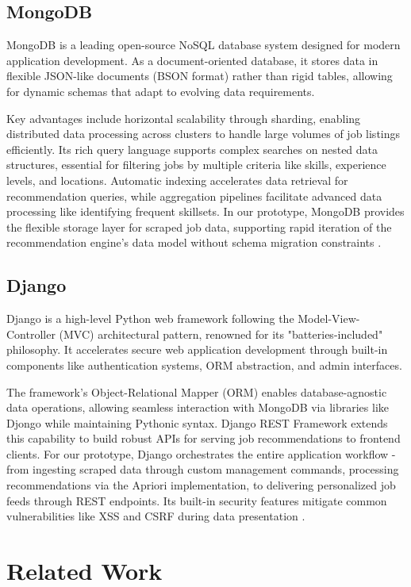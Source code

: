 \documentclass[runningheads]{llncs}
\begin{document}
\subsection{MongoDB}
MongoDB is a leading open-source NoSQL database system designed for modern application development. As a document-oriented database, it stores data in flexible JSON-like documents (BSON format) rather than rigid tables, allowing for dynamic schemas that adapt to evolving data requirements.

Key advantages include horizontal scalability through sharding, enabling distributed data processing across clusters to handle large volumes of job listings efficiently. Its rich query language supports complex searches on nested data structures, essential for filtering jobs by multiple criteria like skills, experience levels, and locations. Automatic indexing accelerates data retrieval for recommendation queries, while aggregation pipelines facilitate advanced data processing like identifying frequent skillsets. In our prototype, MongoDB provides the flexible storage layer for scraped job data, supporting rapid iteration of the recommendation engine's data model without schema migration constraints \cite{mongodbdocs}.

\subsection{Django}
Django is a high-level Python web framework following the Model-View-Controller (MVC) architectural pattern, renowned for its "batteries-included" philosophy. It accelerates secure web application development through built-in components like authentication systems, ORM abstraction, and admin interfaces.

The framework's Object-Relational Mapper (ORM) enables database-agnostic data operations, allowing seamless interaction with MongoDB via libraries like Djongo while maintaining Pythonic syntax. Django REST Framework extends this capability to build robust APIs for serving job recommendations to frontend clients. For our prototype, Django orchestrates the entire application workflow - from ingesting scraped data through custom management commands, processing recommendations via the Apriori implementation, to delivering personalized job feeds through REST endpoints. Its built-in security features mitigate common vulnerabilities like XSS and CSRF during data presentation \cite{djangodocs}.

	\section{Related Work}
	
\end{document}
